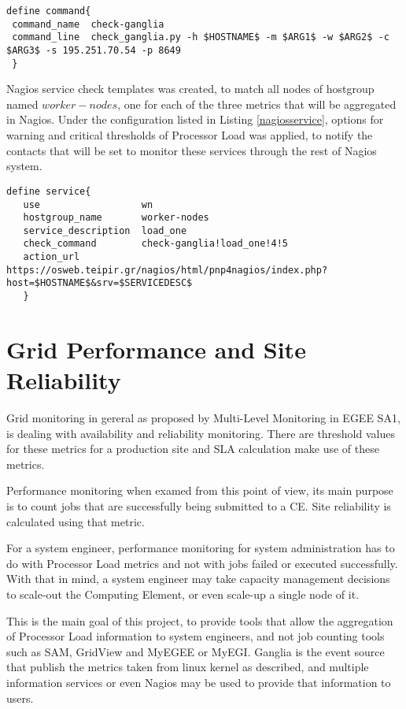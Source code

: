 \begin{lstlisting}[label=checkganglia]
define command{
 command_name  check-ganglia
 command_line  check_ganglia.py -h $HOSTNAME$ -m $ARG1$ -w $ARG2$ -c $ARG3$ -s 195.251.70.54 -p 8649
 }
\end{lstlisting}

Nagios service check templates was created, to match all nodes of hostgroup named $worker-nodes$, one for each of the three metrics that will be aggregated in Nagios. Under the configuration listed in Listing \ref{nagiosservice}, options for warning and critical thresholds of Processor Load was applied, to notify the contacts that will be set to monitor these services through the rest of Nagios system.

\begin{lstlisting}[label=nagiosservice]
define service{
   use                  wn
   hostgroup_name       worker-nodes
   service_description  load_one
   check_command        check-ganglia!load_one!4!5
   action_url           https://osweb.teipir.gr/nagios/html/pnp4nagios/index.php?host=$HOSTNAME$&srv=$SERVICEDESC$
   }
\end{lstlisting}

\section{Grid Performance and Site Reliability}

Grid monitoring in gereral as proposed by Multi-Level Monitoring in EGEE SA1, is dealing with availability and reliability monitoring. There are threshold values for these metrics for a production site and SLA calculation make use of these metrics.

Performance monitoring when examed from this point of view, its main purpose is to count jobs that are successfully being submitted to a CE. Site reliability is calculated using that metric.

For a system engineer, performance monitoring for system administration has to do with Processor Load metrics and not with jobs failed or executed successfully. With that in mind, a system engineer may take capacity management decisions to scale-out the Computing Element, or even scale-up a single node of it.

This is the main goal of this project, to provide tools that allow the aggregation of Processor Load information to system engineers, and not job counting tools such as SAM, GridView and MyEGEE or MyEGI. Ganglia is the event source that publish the metrics taken from linux kernel as described, and multiple information services or even Nagios may be used to provide that information to users.

